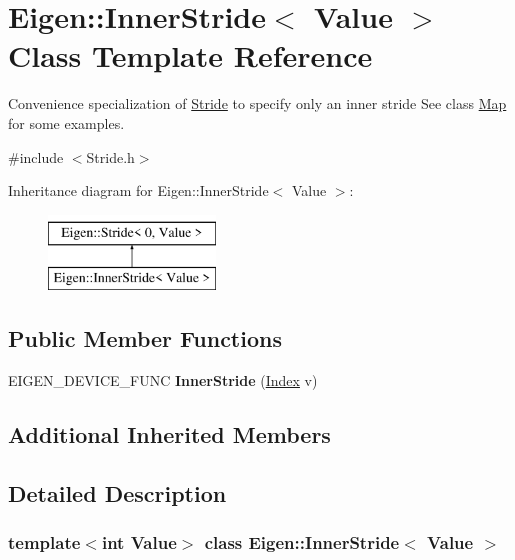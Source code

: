 \hypertarget{class_eigen_1_1_inner_stride}{}\section{Eigen\+::Inner\+Stride$<$ Value $>$ Class Template Reference}
\label{class_eigen_1_1_inner_stride}


Convenience specialization of \mbox{\hyperlink{class_eigen_1_1_stride}{Stride}} to specify only an inner stride See class \mbox{\hyperlink{class_eigen_1_1_map}{Map}} for some examples.  




{\ttfamily \#include $<$Stride.\+h$>$}

Inheritance diagram for Eigen\+::Inner\+Stride$<$ Value $>$\+:\begin{figure}[H]
\begin{center}
\leavevmode
\includegraphics[height=2.000000cm]{class_eigen_1_1_inner_stride}
\end{center}
\end{figure}
\subsection*{Public Member Functions}
\begin{DoxyCompactItemize}
\item 
\mbox{\label{class_eigen_1_1_inner_stride_a20ca7713cfa33c0b0de61123bc0ea647}} 
E\+I\+G\+E\+N\+\_\+\+D\+E\+V\+I\+C\+E\+\_\+\+F\+U\+NC {\bfseries Inner\+Stride} (\mbox{\hyperlink{class_eigen_1_1_stride_a96c2dfb0ce43fd8e19adcdf6094f5f63}{Index}} v)
\end{DoxyCompactItemize}
\subsection*{Additional Inherited Members}


\subsection{Detailed Description}
\subsubsection*{template$<$int Value$>$\newline
class Eigen\+::\+Inner\+Stride$<$ Value $>$}

